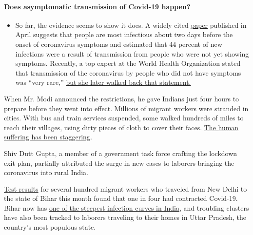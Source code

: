 \begin{itemize}
{  \paragraph{Does asymptomatic transmission of Covid-19
  happen?}\label{does-asymptomatic-transmission-of-covid-19-happen}}

  \begin{itemize}
  \tightlist
  \item
    So far, the evidence seems to show it does. A widely cited
    \href{https://www.nature.com/articles/s41591-020-0869-5}{paper}
    published in April suggests that people are most infectious about
    two days before the onset of coronavirus symptoms and estimated that
    44 percent of new infections were a result of transmission from
    people who were not yet showing symptoms. Recently, a top expert at
    the World Health Organization stated that transmission of the
    coronavirus by people who did not have symptoms was ``very rare,''
    \href{https://www.nytimes.com/2020/06/09/world/coronavirus-updates.html?action=click\&pgtype=Article\&state=default\&region=MAIN_CONTENT_3\&context=storylines_faq\#link-1f302e21}{but
    she later walked back that statement.}
  \end{itemize}
\end{itemize}

When Mr. Modi announced the restrictions, he gave Indians just four
hours to prepare before they went into effect. Millions of migrant
workers were stranded in cities. With bus and train services suspended,
some walked hundreds of miles to reach their villages, using dirty
pieces of cloth to cover their faces.
\href{https://www.nytimes.com/2020/05/08/world/asia/india-leak-train-reopen.html}{The
human suffering has been staggering}.

Shiv Dutt Gupta, a member of a government task force crafting the
lockdown exit plan, partially attributed the surge in new cases to
laborers bringing the coronavirus into rural India.

\href{https://indianexpress.com/article/india/coronavirus-migrants-back-in-bihar-show-high-positivity-1-in-4-tested-from-delhi-6416531/}{Test
results} for several hundred migrant workers who traveled from New Delhi
to the state of Bihar this month found that one in four had contracted
Covid-19. Bihar now has
\href{https://indianexpress.com/article/explained/coronavirus-numbers-explained-bihar/}{one
of the steepest infection curves in India}, and troubling clusters have
also been tracked to laborers traveling to their homes in Uttar Pradesh,
the country's most populous state.

